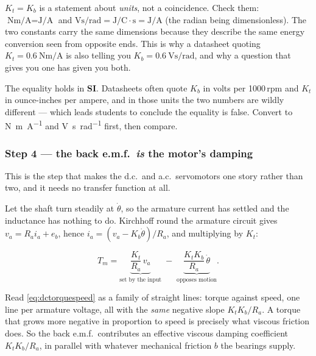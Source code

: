 \documentclass[11pt,a4paper]{article}
\begin{document}
\begin{keyidea}
$K_{t}=K_{b}$ is a statement about \emph{units}, not a coincidence. Check
them: $\si{\newton\metre\per\ampere}=\si{\joule\per\ampere}$ and
$\si{\volt\second\per\radian}=\si{\joule\per\coulomb}\cdot\si{\second}
=\si{\joule\per\ampere}$ (the radian being dimensionless). The two constants
carry the same dimensions because they describe the same energy conversion
seen from opposite ends. This is why a datasheet quoting
$K_{t}=\SI{0.6}{\newton\metre\per\ampere}$ is also telling you
$K_{b}=\SI{0.6}{\volt\second\per\radian}$, and why a question that gives you
one has given you both.
\end{keyidea}

\begin{pitfall}
The equality holds in \textbf{SI}. Datasheets often quote $K_{b}$ in volts per
1000\,rpm and $K_{t}$ in ounce-inches per ampere, and in those units the two
numbers are wildly different --- which leads students to conclude the equality
is false. Convert to \si{\newton\metre\per\ampere} and
\si{\volt\second\per\radian} first, then compare.
\end{pitfall}

\subsubsection{Step 4 --- the back e.m.f.\ \emph{is} the motor's damping}
\label{sss:dcdamping}

This is the step that makes the d.c.\ and a.c.\ servomotors one story rather
than two, and it needs no transfer function at all.

Let the shaft turn steadily at $\dot\theta$, so the armature current has
settled and the inductance has nothing to do. Kirchhoff round the armature
circuit gives $v_{a}=R_{a}i_{a}+e_{b}$, hence
$i_{a}=(v_{a}-K_{b}\dot\theta)/R_{a}$, and multiplying by $K_{t}$:

\begin{equation}
  T_{m}=\underbrace{\frac{K_{t}}{R_{a}}\,v_{a}}_{\text{set by the input}}
       \;-\;\underbrace{\frac{K_{t}K_{b}}{R_{a}}\,\dot\theta}_{\text{opposes motion}} .
  \label{eq:dctorquespeed}
\end{equation}

Read \eqref{eq:dctorquespeed} as a family of straight lines: torque against
speed, one line per armature voltage, all with the \emph{same} negative slope
$K_{t}K_{b}/R_{a}$. A torque that grows more negative in proportion to speed is
precisely what viscous friction does. So the back e.m.f.\ contributes an
effective viscous damping coefficient $K_{t}K_{b}/R_{a}$, in parallel with
whatever mechanical friction $b$ the bearings supply.
\end{document}
